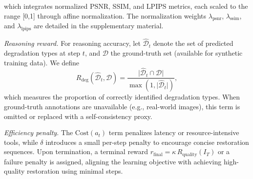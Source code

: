 which integrates normalized PSNR, SSIM, and LPIPS metrics, each scaled to the range [0,1] through affine normalization.
The normalization weights $\lambda_{\text{psnr}}$, $\lambda_{\text{ssim}}$, and $\lambda_{\text{lpips}}$ are detailed in the supplementary material.

\vspace{3pt}
\noindent\textit{Reasoning reward.}
For reasoning accuracy, let $\hat{\mathcal D}_t$ denote the set of predicted degradation types at step $t$, and $\mathcal D$ the ground-truth set (available for synthetic training data).
We define
\[
R_{\text{deg}}(\hat{\mathcal D}_t,\mathcal D)=
\frac{\lvert \hat{\mathcal D}_t\cap \mathcal D\rvert}{\max(1,\lvert \hat{\mathcal D}_t\rvert)},
\]
which measures the proportion of correctly identified degradation types.
When ground-truth annotations are unavailable (e.g., real-world images), this term is omitted or replaced with a self-consistency proxy.

\vspace{3pt}
\noindent\textit{Efficiency penalty.}
The $\mathrm{Cost}(a_t)$ term penalizes latency or resource-intensive tools, while $\delta$ introduces a small per-step penalty to encourage concise restoration sequences.
Upon termination, a terminal reward
$r_{\text{final}}=\kappa\,R_{\text{quality}}(I_T)$
or a failure penalty is assigned, aligning the learning objective with achieving high-quality restoration using minimal steps.







